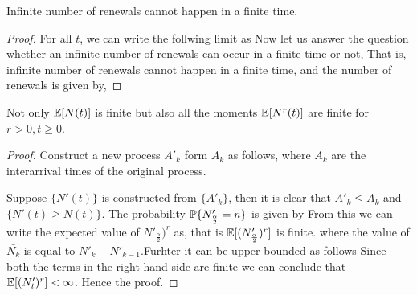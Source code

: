 \documentclass[a4paper,10pt, english]{article}
\begin{document}
\begin{prop}
Infinite number of renewals cannot happen in a finite time.
\end{prop}
\begin{proof}
For all $t$, we can write the follwing limit as
Now let us answer the question whether an infinite number of renewals can occur in a finite time or not,
That is, infinite number of renewals cannot happen in a finite time, and the number of renewals is given by,
\end{proof}

\begin{prop}
Not only $\E[N(t)]$ is finite but also all the moments $\E[N^r(t)]$ are finite for $r > 0, t \ge 0$.
\end{prop}

\begin{proof}
Construct a new process $A'_k$ form $A_k$ as follows,
where $A_k$ are the interarrival times of the original process.

Suppose $\{N'(t)\}$ is constructed from $\{A'_k\}$, then it is clear that $A'_k \le A_k$ and $\{N'(t) \ge N(t)\}$.
The probability $\P\{ N'_{\frac{\alpha}{2}} = n\}$ is given by
From this we can write the expected value of $N'_{\frac{\alpha}{2}})^r$ as,
that is $\E[(N'_{\frac{\alpha}{2}})^r]$ is finite.
\eq{
\E[(N'_t)^r] = \E \big{[}\sum_{k=1}^{\frac{t}{\alpha}+1} (\bar{N_k})^r \big{]}
}
where the value of $\bar{N_k}$ is equal to $N'_k-N'_{k-1}$.Furhter it can be upper bounded as follows
Since both the terms in the right hand side are finite we can conclude that $\E[(N'_t)^r] < \infty$. Hence the proof.
\end{proof}
\end{document}
